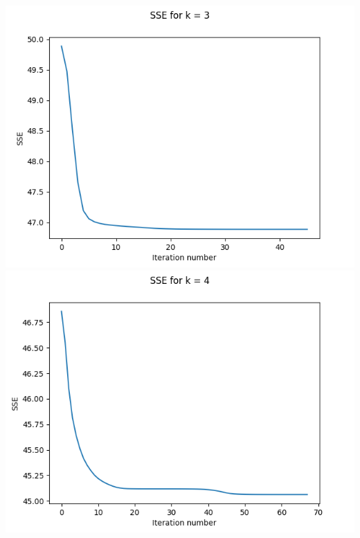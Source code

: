 \documentclass{article}
\begin{document}
\begin{center}
    \includegraphics[scale=0.4]{images/task1_5_graph_3.png}
    \includegraphics[scale=0.4]{images/task1_5_graph_4.png}
\end{center}
\vspace{0.2cm}
\end{document}
